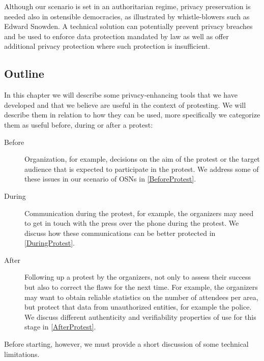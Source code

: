 Although our scenario is set in an authoritarian regime, privacy
preservation is needed also in ostensible democracies, as illustrated
by whistle-blowers such as Edward Snowden. 
A technical solution can potentially prevent privacy breaches and be
used to enforce data protection mandated by law as well as offer
additional privacy protection where such protection is insufficient.



\subsection{Outline}
\label{Outline}

In this chapter we will describe some privacy-enhancing tools that we have 
developed and that we believe are useful in the context of protesting.
We will describe them in relation to how they can be used, more specifically we 
categorize them as useful before, during or after a protest:
\begin{description}
  \item[Before]
    Organization, for example, decisions on the aim of the protest or the 
    target audience that is expected to participate in the protest.
    We address some of these issues in our scenario of \acp{OSN} in 
    \cref{BeforeProtest}.

  \item[During]
    Communication during the protest, for example, the organizers may need to 
    get in touch with the press over the phone during the protest.
    We discuss how these communications can be better protected in 
    \cref{DuringProtest}.

  \item[After]
    Following up a protest by the organizers, not only to assess their success 
    but also to correct the flaws for the next time.  For example, the 
    organizers may want to obtain reliable statistics on the number of 
    attendees per area, but protect that data from unauthorized
    entities, for example the police.
    We discuss different authenticity and verifiability properties of use for 
    this stage in \cref{AfterProtest}.
\end{description}

Before starting, however, we must provide a short discussion of some technical 
limitations.
